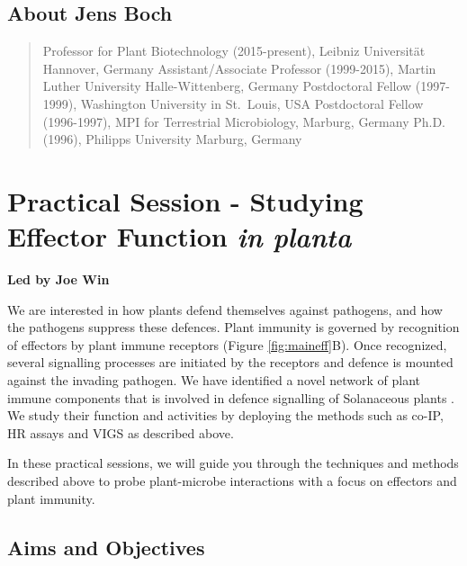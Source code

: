 \documentclass[12pt,]{book}
\theoremstyle{definition}
\theoremstyle{definition}
\theoremstyle{remark}
\begin{document}
\subsection*{About Jens Boch}\label{about-jens-boch}

\begin{quote}
Professor for Plant Biotechnology (2015-present), Leibniz Universität
Hannover, Germany Assistant/Associate Professor (1999-2015), Martin
Luther University Halle-Wittenberg, Germany Postdoctoral Fellow
(1997-1999), Washington University in St.~Louis, USA Postdoctoral Fellow
(1996-1997), MPI for Terrestrial Microbiology, Marburg, Germany Ph.D.
(1996), Philipps University Marburg, Germany
\end{quote}

\section*{\texorpdfstring{Practical Session - Studying Effector Function
\emph{in
planta}}{Practical Session - Studying Effector Function in planta}}\label{practical-session---studying-effector-function-in-planta}

\textbf{Led by Joe Win}

We are interested in how plants defend themselves against pathogens, and
how the pathogens suppress these defences. Plant immunity is governed by
recognition of effectors by plant immune receptors (Figure
\ref{fig:maineff}B). Once recognized, several signalling processes are
initiated by the receptors and defence is mounted against the invading
pathogen. We have identified a novel network of plant immune components
that is involved in defence signalling of Solanaceous plants
\citep{Wu:2016bio}. We study their function and activities by deploying
the methods such as co-IP, HR assays and VIGS as described above.

In these practical sessions, we will guide you through the techniques
and methods described above to probe plant-microbe interactions with a
focus on effectors and plant immunity.

\subsection*{Aims and Objectives}\label{aims-and-objectives-2}
\end{document}
